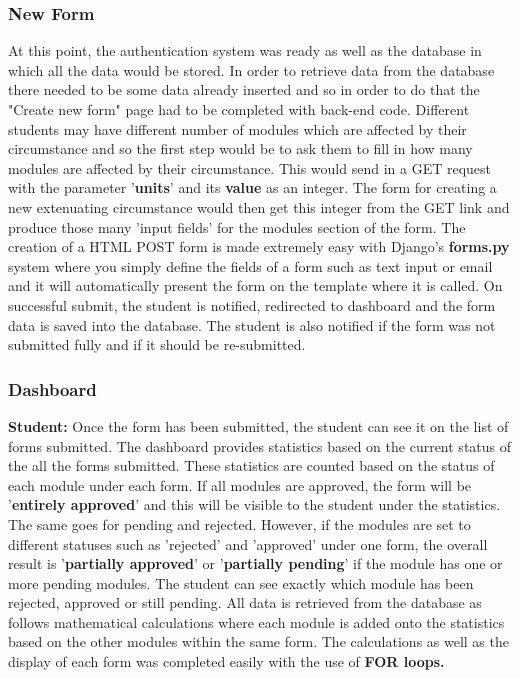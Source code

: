 \documentclass[../main.tex]{subfiles}
\begin{document}
\subsubsection{New Form}
At this point, the authentication system was ready as well as the database in which all the data would be stored. In order to retrieve data from the database there needed to be some data already inserted and so in order to do that the "Create new form" page had to be completed with back-end code. Different students may have different number of modules which are affected by their circumstance and so the first step would be to ask them to fill in how many modules are affected by their circumstance. This would send in a GET request with the parameter '\textbf{units}' and its \textbf{value} as an integer. The form for creating a new extenuating circumstance would then get this integer from the GET link and produce those many 'input fields' for the modules section of the form. The creation of a HTML POST form is made extremely easy with Django's \textbf{forms.py} system where you simply define the fields of a form such as text input or email and it will automatically present the form on the template where it is called. On successful submit, the student is notified, redirected to dashboard and the form data is saved into the database. The student is also notified if the form was not submitted fully and if it should be re-submitted.

\subsubsection{Dashboard} 
\textbf{Student:} Once the form has been submitted, the student can see it on the list of forms submitted. The dashboard provides statistics based on the current status of the all the forms submitted. These statistics are counted based on the status of each module under each form. If all modules are approved, the form will be '\textbf{entirely approved}' and this will be visible to the student under the statistics. The same goes for pending and rejected. However, if the modules are set to different statuses such as 'rejected' and 'approved' under one form, the overall result is '\textbf{partially approved}' or '\textbf{partially pending}' if the module has one or more pending modules. The student can see exactly which module has been rejected, approved or still pending.  All data is retrieved from the database as follows mathematical calculations where each module is added onto the statistics based on the other modules within the same form. The calculations as well as the display of each form was completed easily with the use of \textbf{FOR loops.}\\[4mm]
\end{document}
